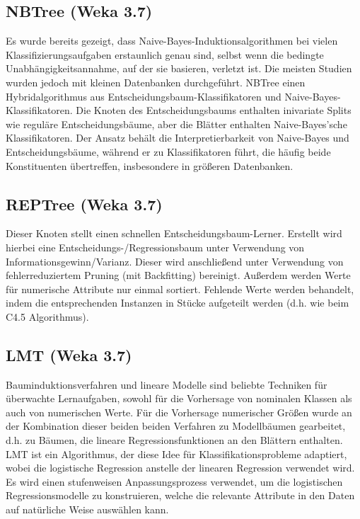 \documentclass[12pt,					%
							 oneside,			%
							 a4paper,			%
							 halfparskip,		%
							 liststotoc,			%
							 bibtotoc,			%
							 fleqn,				%
							 pointlessnumbers]	%
							 {scrreprt}
\begin{document}
		\subsection{NBTree (Weka 3.7)}
			Es wurde bereits gezeigt, dass Naive-Bayes-Induktionsalgorithmen bei vielen Klassifizierungsaufgaben erstaunlich genau sind, selbst wenn die bedingte Unabhängigkeitsannahme, auf der sie basieren, verletzt ist. Die meisten Studien wurden jedoch mit kleinen Datenbanken durchgeführt. NBTree einen Hybridalgorithmus aus Entscheidungsbaum-Klassifikatoren und Naive-Bayes-Klassifikatoren. Die Knoten des Entscheidungsbaums enthalten inivariate Splits wie reguläre Entscheidungsbäume, aber die Blätter enthalten Naive-Bayes'sche Klassifikatoren. Der Ansatz behält die Interpretierbarkeit von Naive-Bayes und Entscheidungsbäume, während er zu Klassifikatoren führt, die häufig beide Konstituenten übertreffen, insbesondere in größeren Datenbanken.\cite{Kohavi1996}
						
		\subsection{REPTree (Weka 3.7)}
			Dieser Knoten stellt einen schnellen Entscheidungsbaum-Lerner. Erstellt wird hierbei eine Entscheidungs-/Regressionsbaum unter Verwendung von Informationsgewinn/Varianz. Dieser wird anschließend unter Verwendung von fehlerreduziertem Pruning (mit Backfitting) bereinigt. Außerdem werden Werte für numerische Attribute nur einmal sortiert. Fehlende Werte werden behandelt, indem die entsprechenden Instanzen in Stücke aufgeteilt werden (d.h. wie beim C4.5 Algorithmus).
		
		\subsection{LMT (Weka 3.7)}
			Bauminduktionsverfahren und lineare Modelle sind beliebte Techniken für überwachte Lernaufgaben, sowohl für die Vorhersage von nominalen Klassen als auch von numerischen Werte. Für die Vorhersage numerischer Größen wurde an der Kombination dieser beiden beiden Verfahren zu \glqq{}Modellbäumen\grqq{} gearbeitet, d.h. zu Bäumen, die lineare Regressionsfunktionen an den Blättern enthalten. LMT ist ein Algorithmus, der diese Idee für Klassifikationsprobleme adaptiert, wobei die logistische Regression anstelle der linearen Regression verwendet wird. Es wird einen stufenweisen Anpassungsprozess verwendet, um die logistischen Regressionsmodelle zu konstruieren, welche die relevante Attribute in den Daten auf natürliche Weise auswählen kann.\cite{Landwehr2005}
						
\end{document}
